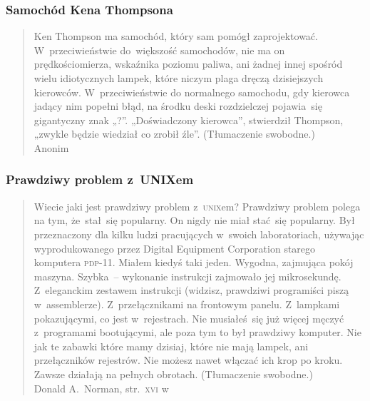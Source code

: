\documentclass[10pt,t]{beamer}
\begin{document}
\begin{frame}
  \frametitle{Samochód Kena Thompsona}


  \begin{quote}

    Ken Thompson ma samochód, który sam pomógł zaprojektować.
    W~przeciwieństwie do~większość samochodów, nie ma on prędkościomierza,
    wskaźnika poziomu paliwa, ani żadnej innej spośród wielu idiotycznych
    lampek, które niczym plaga dręczą dzisiejszych kierowców.
    W~przeciwieństwie do normalnego samochodu, gdy kierowca jadący nim
    popełni błąd, na środku deski rozdzielczej pojawia~się
    gigantyczny znak „?”. „Doświadczony kierowca”, stwierdził Thompson,
    „zwykle będzie wiedział co zrobił źle”. (Tłumaczenie swobodne.) \\
    Anonim

  \end{quote}

\end{frame}





\begin{frame}
  \frametitle{Prawdziwy problem z~UNIXem}


  \begin{quote}

    Wiecie jaki jest prawdziwy problem z~\textsc{unix}em? Prawdziwy problem
    polega na tym, że~stał~się popularny. On nigdy nie miał stać~się
    popularny. Był przeznaczony dla kilku ludzi pracujących w~swoich
    laboratoriach, używając wyprodukowanego przez Digital Equipment
    Corporation starego
    komputera \textsc{pdp}-11. Miałem kiedyś taki jeden. Wygodna, zajmująca
    pokój maszyna. Szybka~-- wykonanie instrukcji zajmowało jej mikrosekundę.
    Z~eleganckim zestawem instrukcji (widzisz, prawdziwi programiści piszą
    w~assemblerze). Z~przełącznikami na frontowym panelu. Z~lampkami
    pokazującymi, co jest w~rejestrach. Nie musiałeś~się już więcej męczyć
    z~programami bootującymi, ale poza tym to był prawdziwy komputer. Nie
    jak te zabawki które mamy dzisiaj, które nie mają lampek, ani
    przełączników rejestrów. Nie możesz nawet włączać ich krop po kroku.
    Zawsze działają na pełnych obrotach. (Tłumaczenie swobodne.) \\
    Donald A.~Norman, str.~\textsc{xvi}
    w~\parencite{Garfinkel-Weise-Strassmann-The-UNIX-HATERS-Handbook-Pub-1994}

  \end{quote}

\end{frame}
\end{document}
